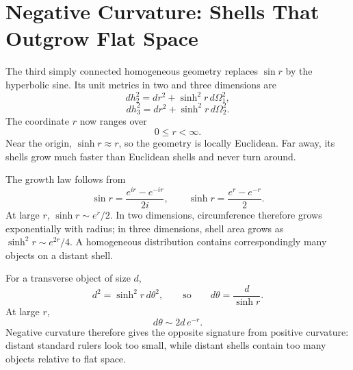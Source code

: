 \section{Negative Curvature: Shells That Outgrow Flat Space}

The third simply connected homogeneous geometry replaces \(\sin r\) by the hyperbolic sine. Its unit metrics in two and three dimensions are
\begin{equation}
dh_2^2 = dr^2 + \sinh^2 r\, d\Omega_1^2,
\label{eq:c03-hyperbolic-two}
\end{equation}
\begin{equation}
dh_3^2 = dr^2 + \sinh^2 r\, d\Omega_2^2.
\label{eq:c03-hyperbolic-three}
\end{equation}
The coordinate \(r\) now ranges over
\begin{equation}
0\le r<\infty.
\end{equation}
Near the origin, \(\sinh r\approx r\), so the geometry is locally Euclidean. Far away, its shells grow much faster than Euclidean shells and never turn around.

The growth law follows from
\begin{equation}
\sin r = \frac{e^{ir}-e^{-ir}}{2i},
\qquad
\sinh r = \frac{e^r-e^{-r}}{2}.
\label{eq:c03-sin-sinh}
\end{equation}
At large \(r\), \(\sinh r\sim e^r/2\). In two dimensions, circumference therefore grows exponentially with radius; in three dimensions, shell area grows as \(\sinh^2r\sim e^{2r}/4\). A homogeneous distribution contains correspondingly many objects on a distant shell.

For a transverse object of size \(d\),
\begin{equation}
d^2 = \sinh^2 r\, d\theta^2,
\qquad\text{so}\qquad
d\theta = \frac{d}{\sinh r}.
\label{eq:c03-hyperbolic-angle}
\end{equation}
At large \(r\),
\begin{equation}
d\theta \sim 2d\,e^{-r}.
\end{equation}
Negative curvature therefore gives the opposite signature from positive curvature: distant standard rulers look too small, while distant shells contain too many objects relative to flat space.

\begin{classroomqa}
\end{classroomqa}

